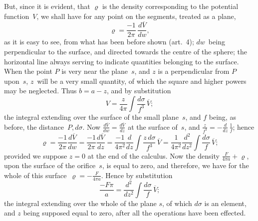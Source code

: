 \documentclass[11pt,notitlepage]{amsart}
\renewcommand{\rho}{\varrho}
\begin{document}
But, since it is evident, that $\rho$ is the density corresponding to the 
potential function~$V$, we shall have for any point on the segments,
treated as a plane,
\[
\rho=\frac{-1}{2\pi}\,\frac{d\overline{V}}{dw},
\]
as it is easy to see, from what has been before shown (art.~4); $dw$~being
perpendicular to the surface, and directed towards the centre of the sphere;
the horizontal line always serving to indicate quantities belonging to the 
surface. When the point $P$ is very near the plane~$s$,
and $z$ is a perpendicular
from $P$ upon~$s$, $z$~will be a very small quantity, of which the square and
higher powers may be neglected. Thus $b=a-z$, and by substitution
\[
V=\frac{z}{4\pi}\int\frac{d\sigma}{f^3}\,\overline{V};
\]
the integral extending over the surface of the small plane~$s$,
and $f$ being, as before,
the distance~$P,d\sigma$.
Now $\frac{d\overline{V}}{dw}=\frac{d\overline{V}}{dz}$
at the surface of~$s$, and $\frac{z}{f^3}=-\frac{d}{dz}\,\frac1f$; hence
\[
\rho=\frac{-1}{2\pi}\frac{d\overline{V}}{dw}
=\frac{-1}{2\pi}\frac{d\overline{V}}{dz}
=\frac{-1}{4\pi^2}\frac{d}{dz}\int\frac{z\,d\sigma}{f^3}\,\overline{V}
=\frac{1}{4\pi^2}\frac{d^2}{dz^2}\int\frac{d\sigma}{f}\,\overline{V};
\]
provided we suppose $z=0$ at the end of the calculus. Now the density
$\frac{F}{4\pi a}+\rho$,
upon the surface of the orifice~$s$, is equal to zero, and therefore,
we have for the whole of this surface~$\rho=-\frac{F}{4\pi a}$.
Hence by substitution
\[
\tag{12.}
\frac{-F\pi}{a}=
\frac{d^2}{dz^2}\int\frac{d\sigma}{f}\,\overline{V};
\]
the integral extending over the whole of the plane $s$,
of which $d\sigma$ is an
element, and $z$ being supposed equal to zero, after all the operations have
been effected.
\end{document}
